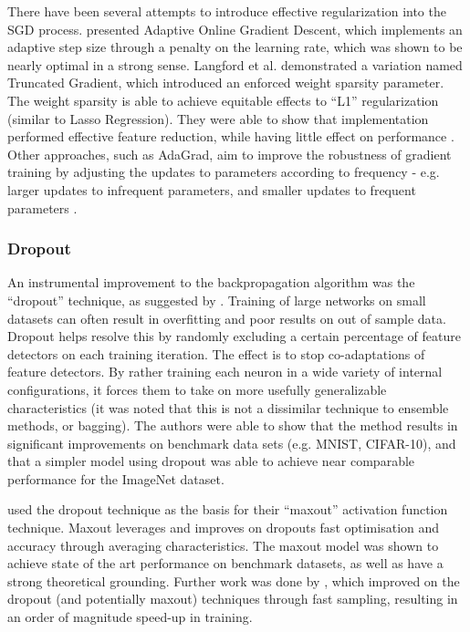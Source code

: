\documentclass[a4paper,11pt,oneside]{article}
\theoremstyle{plain}
\theoremstyle{definition}
\begin{document}
	There have been several attempts to introduce effective regularization into the SGD process. \citet{Bartlett} 
	presented Adaptive Online Gradient Descent, which implements an adaptive step size through a 
	penalty on the learning rate, which was shown to be nearly optimal in a strong sense. Langford et al. 
	demonstrated a variation named Truncated Gradient, which introduced an enforced weight sparsity parameter. 
	The weight sparsity is able to achieve equitable effects to ``L1'' regularization (similar to Lasso Regression). 
	They were able to show that implementation performed effective feature reduction, while having little effect on 
	performance \citep{Langford}. Other approaches, such as AdaGrad, aim to improve the robustness of gradient training by 
	adjusting the updates to parameters according to frequency - e.g. larger updates to infrequent parameters, and 
	smaller updates to frequent parameters \citep{Duchi, Zeiler}. 
	\hfill\break
	
	\subsubsection{Dropout}
	
	An instrumental improvement to the backpropagation 
	algorithm was the ``dropout'' technique, as suggested by \citet{Hinton4}. Training of large networks on small datasets can often result in overfitting and poor results on out of sample data. Dropout helps 
	resolve this by randomly excluding a certain percentage of feature detectors on each training iteration. 
	The effect is to stop co-adaptations of feature detectors. By rather training each neuron in a wide variety of 
	internal configurations, it forces them to take on more usefully generalizable characteristics (it was noted that this
	is not a dissimilar technique to ensemble methods, or bagging). The authors were able to show that the method
	results in significant improvements on benchmark data sets (e.g. MNIST, CIFAR-10), and that a simpler model 
	using dropout was able to achieve near comparable performance for the ImageNet dataset.
	\hfill \break 
	
	\citet{Goodfellow} used the dropout technique as the basis for their ``maxout'' activation function technique. Maxout 
	leverages and improves on dropout\textsc{}s fast optimisation and accuracy through averaging characteristics. The 
	maxout model was shown to achieve state of the art performance on benchmark datasets, as well as have a 
	strong theoretical grounding. Further work was done by \citet{Wang2}, which improved on the dropout 
	(and potentially maxout) techniques through fast sampling, resulting in an order of magnitude speed-up in
	training.
	\hfill \break 
	
\end{document}
